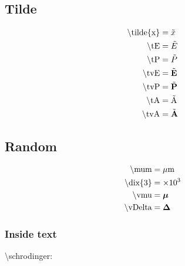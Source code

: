 \subsection{Tilde}
\begin{subequations}
\begin{align}
\textrm{\textbackslash tilde\{x\}}          & = \tilde{x}           \label{eqn:tilde} \\
\textrm{\textbackslash tE}                  & = \tilde{E}                 \label{eqn:tE} \\
\textrm{\textbackslash tP}                  & = \tilde{P}                 \label{eqn:tP} \\
\textrm{\textbackslash tvE}                 & = \tilde{\textbf{E}}                \label{eqn:tvE} \\
\textrm{\textbackslash tvP}                 & = \tilde{\textbf{P}}                \label{eqn:tvP} \\
\textrm{\textbackslash tA}                  & = \tilde{\textrm{A}}                 \label{eqn:tA} \\
\textrm{\textbackslash tvA}                 & = \tilde{\textbf{A}}                \label{eqn:tvA}
\end{align}
\end{subequations}






\subsection{Random}
\begin{align}
\textrm{\textbackslash mum}                 & = \mu \textrm{m}                \label{eqn:mum} \\
\textrm{\textbackslash dix\{3\}}            & = \times 10^{3}             \label{eqn:dix} \\
\textrm{\textbackslash vmu}                 & = \bm{\mu}                \label{eqn:vmu} \\
\textrm{\textbackslash vDelta}              & = \bm{\Delta}             \label{eqn:vDelta}
\end{align}

\subsubsection{Inside text}
\textbackslash schrodinger: \schrodinger









